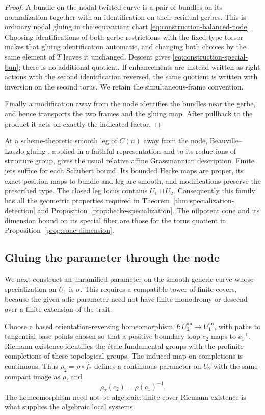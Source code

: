 \begin{proof}
A bundle on the nodal twisted curve is a pair of bundles on its
normalization together with an identification on their residual
gerbes.  This is ordinary nodal gluing in the equivariant chart
\eqref{eq:construction-balanced-node}.  Choosing identifications of
both gerbe restrictions with the fixed type torsor makes that gluing
identification automatic, and changing both choices by the same
element of $T$ leaves it unchanged.  Descent gives
\eqref{eq:construction-special-bun}; there is no additional quotient.
If enhancements are instead written as right actions with the second
identification reversed, the same quotient is written with inversion
on the second torus.  We retain the simultaneous-frame convention.

Finally a modification away from the node identifies the bundles near
the gerbe, and hence transports the two frames and the gluing map.
After pullback to the product it acts on exactly the indicated factor.
\end{proof}

At a scheme-theoretic smooth leg of $C(n)$ away from the node,
Beauville--Laszlo gluing \cite[Section~3]{BeauvilleLaszlo}, applied in a
faithful representation and to its reductions of structure group,
gives the usual relative affine Grassmannian description.  Finite jets
suffice for each Schubert bound.  Its bounded
Hecke maps are proper, its exact-position maps to bundle and leg are
smooth, and modifications preserve the prescribed type.  The closed
leg locus contains $U_1\sqcup U_2$.  Consequently this family has all
the geometric properties required in
Theorem~\ref{thm:specialization-detection} and
Proposition~\ref{prop:hecke-specialization}.  The nilpotent cone and its
dimension bound on its special fiber are those for the torus quotient
in Proposition~\ref{prop:cone-dimension}.

\subsection{Gluing the parameter through the node}

We next construct an unramified parameter on the smooth generic curve
whose specialization on $U_1$ is $\sigma$.  This requires a compatible
tower of finite covers, because the given adic parameter need not have
finite monodromy or descend over a finite extension of the trait.

Choose a based orientation-reversing homeomorphism
$f:U_2^{\mathrm{an}}\to U_1^{\mathrm{an}}$, with paths to tangential
base points chosen so that a positive boundary loop $c_2$ maps to
$c_1^{-1}$.  Riemann existence identifies the \'etale fundamental
groups with the profinite completions of these topological groups.
The induced map on completions is continuous.  Thus
$\rho_2=\rho\circ\widehat f_*$ defines a continuous parameter on $U_2$
with the same compact image as $\rho$, and
\begin{equation}\label{eq:construction-boundary-inverse}
 \rho_2(c_2)=\rho(c_1)^{-1}.
\end{equation}
The homeomorphism need not be algebraic: finite-cover Riemann existence
is what supplies the algebraic local systems.

